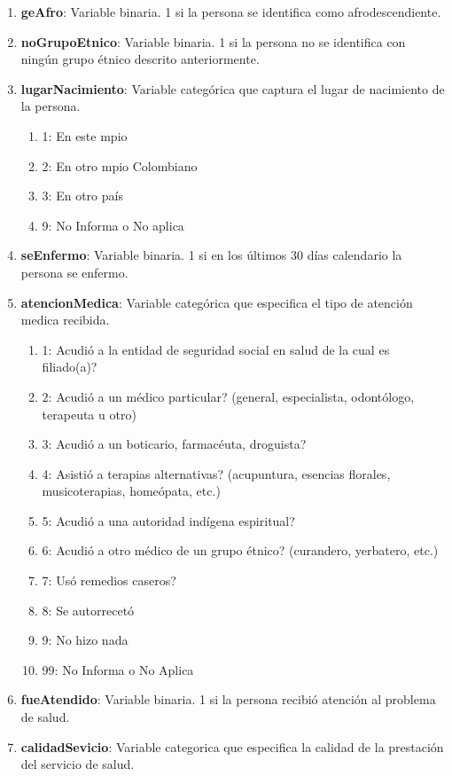 \documentclass[12pt,a4paper]{article}
\begin{document}
\begin{enumerate}
	\item \textbf{geAfro}: Variable binaria. 1 si la persona se identifica como afrodescendiente.
	\item \textbf{noGrupoEtnico}: Variable binaria. 1 si la persona no se identifica con ningún grupo étnico descrito anteriormente.
	\item \textbf{lugarNacimiento}: Variable categórica que captura el lugar de nacimiento de la persona.
		\begin{enumerate}
			\item 1: En este mpio
			\item 2: En otro mpio Colombiano
			\item 3: En otro país
			\item 9: No Informa o No aplica
		\end{enumerate}
	\item \textbf{seEnfermo}: Variable binaria. 1 si en los últimos 30 días calendario la persona se enfermo. 
	\item \textbf{atencionMedica}: Variable categórica que especifica el tipo de atención medica recibida.
		\begin{enumerate}
			\item 1: Acudió a la entidad de seguridad social en salud de la cual es filiado(a)?
			\item 2: Acudió a un médico particular? (general, especialista, odontólogo, terapeuta u otro)
			\item 3: Acudió a un boticario, farmacéuta, droguista?
			\item 4: Asistió a terapias alternativas? (acupuntura, esencias florales, musicoterapias, homeópata, etc.)
			\item 5: Acudió a una autoridad indígena espiritual?
			\item 6: Acudió a otro médico de un grupo étnico? (curandero, yerbatero, etc.)
			\item 7: Usó remedios caseros?
			\item 8: Se autorrecetó
			\item 9: No hizo nada
			\item 99: No Informa o No Aplica
		\end{enumerate}
	\item \textbf{fueAtendido}: Variable binaria. 1 si la persona recibió atención al problema de salud.
	\item \textbf{calidadSevicio}: Variable categorica que especifica la calidad de la prestación del servicio de salud.
		\begin{enumerate}

\end{enumerate}
\end{enumerate}
\end{document}
